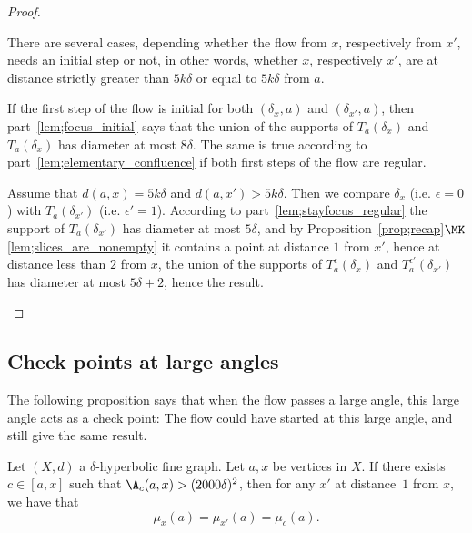 \begin{proof}
\begin{laststep}[\eqref{prop;firststep}]
There are several cases, depending whether the flow from $x$, respectively from $x'$, needs an initial step or not, in other words, whether $x$, respectively $x'$, are at distance strictly greater than $5k\delta$ or equal to $5k\delta$ from $a$.

If the first step of the flow is initial for both $(\delta_x, a)$ and $(\delta_{x'}, a)$, then part~\eqref{lem;focus_initial} says that the union of the supports of $T_a(\delta_x)$ and $T_a(\delta_x)$ has diameter at most $8\delta$. The same is true according to part~\eqref{lem;elementary_confluence} if both first steps of the flow are regular.

Assume that $d(a,x) = 5k\delta$ and $d(a,x') >5k\delta$. Then we compare $\delta_x$ (i.e. $\epsilon =0$) with $T_a(\delta_{x'})$ (i.e. $\epsilon' =1$). According to part~\eqref{lem;stayfocus_regular} the support of $T_a(\delta_{x'})$ has diameter at most $5\delta$, and by Proposition~\ref{prop;recap}$\MK$\eqref{lem;slices_are_nonempty} it contains a point at distance $1$ from $x'$, hence at distance less than $2$ from $x$, the union of the supports of $T^\epsilon_a(\delta_x)$ and $T^{\epsilon'}_a(\delta_{x'})$ has diameter at most $5\delta+2$, hence the result.
\end{laststep}
\let\qed\relax
\end{proof}

\subsection{Check points at large angles}

The following proposition says that when the flow passes a large angle, this large angle acts as a check point: The flow could have started at this large angle, and still give the same result.

\begin{prop}\label{prop;checkpoint}
Let $(X,d)$ a $\delta$-hyperbolic fine graph. Let $a, x$ be vertices in $X$. If there exists $c\in [a,x]$ such that $\A_c(a,x)>(2000 \delta)^2$, then for any $x'$ at distance~$1$ from $x$, we have that
\[
\mu_x(a) = \mu_{x'}(a)= \mu_c(a).
\]
\end{prop}

